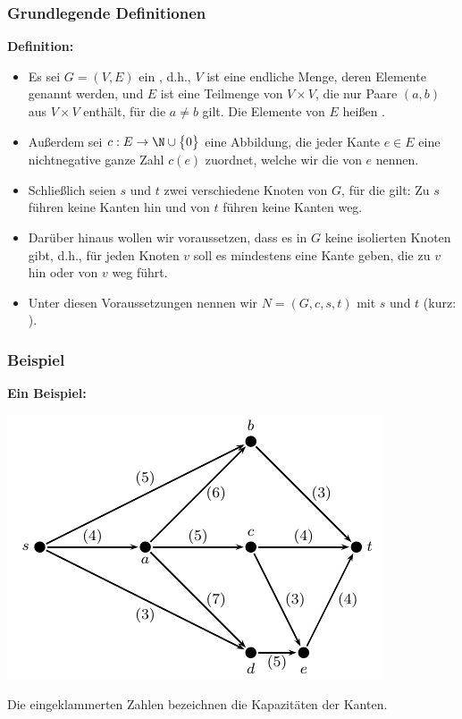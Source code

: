 \documentclass[smaller]{beamer}
\begin{document}
\begin{frame}
 \frametitle{Grundlegende Definitionen}
\textbf{Definition:} 
\begin{itemize}
\item Es sei $G=(V,E)$ ein , d.h., $V$ ist eine endliche Menge, deren Elemente  genannt werden, und $E$ ist eine Teilmenge von $V \times V$, die nur Paare $(a,b)$ aus $V \times V$ enthält, für die $a \neq b$ gilt. Die Elemente von $E$ heißen .

\item Außerdem sei $c: E \rightarrow \N \cup \bigl\{ 0 \bigr\}$ eine Abbildung, die jeder Kante $e \in E$ eine nichtnegative ganze Zahl $c(e)$ zuordnet, welche wir die  von $e$ nennen.

\item Schließlich seien $s$ und $t$ zwei verschiedene Knoten von $G$, für die gilt: \alert{Zu $s$ führen keine Kanten hin und von $t$ führen keine Kanten weg.} 

\item Darüber hinaus wollen wir voraussetzen, dass es in $G$ \alert{keine isolierten Knoten} gibt, d.h., für jeden Knoten $v$ soll es mindestens eine Kante geben, die zu $v$ hin oder von $v$ weg führt.

\item Unter diesen Voraussetzungen nennen wir $N=(G,c,s,t)$  mit  $s$ und  $t$ (kurz: ).
\end{itemize}
\end{frame}

\begin{frame}
 \frametitle{Beispiel}
 \textbf{Ein Beispiel:}
 \begin{center}
  \includegraphics{fig7.pdf}
 \end{center}
Die eingeklammerten Zahlen bezeichnen die \alert{Kapazitäten} der Kanten.
\end{frame}
\end{document}
